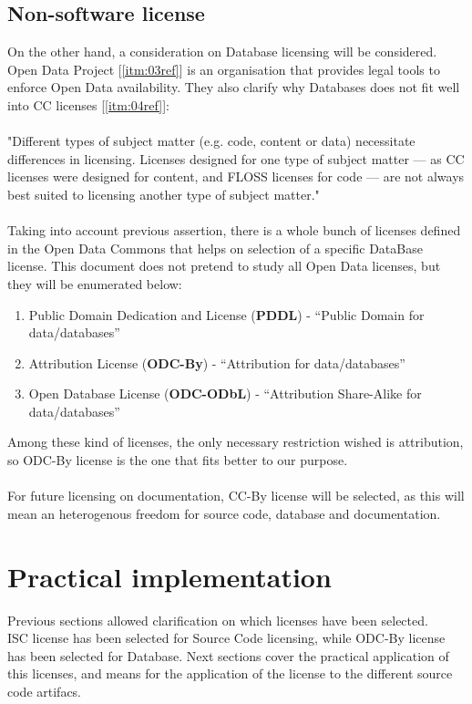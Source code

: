 \documentclass[11pt]{article}
\begin{document}
\subsection{Non-software license}
On the other hand, a consideration on Database licensing will be considered. Open Data Project [\ref{itm:03ref}] is an organisation that provides legal tools to enforce Open Data availability. They also clarify why Databases does not fit well into CC licenses [\ref{itm:04ref}]:\\
\\
"Different types of subject matter (e.g. code, content or data) necessitate differences in licensing. Licenses designed for one type of subject matter — as CC licenses were designed for content, and FLOSS licenses for code — are not always best suited to licensing another type of subject matter."\\
\\
Taking into account previous assertion, there is a whole bunch of licenses defined in the Open Data Commons that helps on selection of a specific DataBase license. This document does not pretend to study all Open Data licenses, but they will be enumerated below:
\begin{enumerate}
\item \label{itm:01odc}Public Domain Dedication and License (\textbf{PDDL}) - “Public Domain for data/databases”
\item \label{itm:02odc}Attribution License (\textbf{ODC-By}) - “Attribution for data/databases”
\item \label{itm:03odc}Open Database License (\textbf{ODC-ODbL}) - “Attribution Share-Alike for data/databases”
\end{enumerate}
Among these kind of licenses, the only necessary restriction wished is attribution, so ODC-By license is the one that fits better to our purpose.\\
\\
For future licensing on documentation, CC-By license will be selected, as this will mean an heterogenous freedom for source code, database and documentation.

\section{Practical implementation}

Previous sections allowed clarification on which licenses have been selected.\\
ISC license has been selected for Source Code licensing, while ODC-By license has been selected for Database. Next sections cover the practical application of this licenses, and means for the application of the license to the different source code artifacs.
\end{document}
